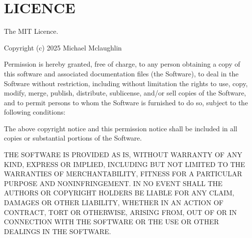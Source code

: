 \chapter{LICENCE}
\hypertarget{md_node__modules_2decimal_8js_2_l_i_c_e_n_c_e}{}\label{md_node__modules_2decimal_8js_2_l_i_c_e_n_c_e}
The MIT Licence.

Copyright (c) 2025 Michael Mclaughlin

Permission is hereby granted, free of charge, to any person obtaining a copy of this software and associated documentation files (the \textquotesingle{}Software\textquotesingle{}), to deal in the Software without restriction, including without limitation the rights to use, copy, modify, merge, publish, distribute, sublicense, and/or sell copies of the Software, and to permit persons to whom the Software is furnished to do so, subject to the following conditions\+:

The above copyright notice and this permission notice shall be included in all copies or substantial portions of the Software.

THE SOFTWARE IS PROVIDED \textquotesingle{}AS IS\textquotesingle{}, WITHOUT WARRANTY OF ANY KIND, EXPRESS OR IMPLIED, INCLUDING BUT NOT LIMITED TO THE WARRANTIES OF MERCHANTABILITY, FITNESS FOR A PARTICULAR PURPOSE AND NONINFRINGEMENT. IN NO EVENT SHALL THE AUTHORS OR COPYRIGHT HOLDERS BE LIABLE FOR ANY CLAIM, DAMAGES OR OTHER LIABILITY, WHETHER IN AN ACTION OF CONTRACT, TORT OR OTHERWISE, ARISING FROM, OUT OF OR IN CONNECTION WITH THE SOFTWARE OR THE USE OR OTHER DEALINGS IN THE SOFTWARE. 